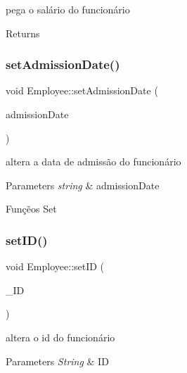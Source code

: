 pega o salário do funcionário 

\begin{DoxyReturn}{Returns}

\end{DoxyReturn}
\mbox{\label{classEmployee_ae513cdd4bf5b02cc20164fdfd18afe26}} 
\subsubsection{\texorpdfstring{set\+Admission\+Date()}{setAdmissionDate()}}
{\footnotesize\ttfamily void Employee\+::set\+Admission\+Date (\begin{DoxyParamCaption}\item[{string}]{admission\+Date }\end{DoxyParamCaption})}



altera a data de admissão do funcionário 


\begin{DoxyParams}{Parameters}
{\em string} & admission\+Date\\
\hline
\end{DoxyParams}
Funçẽos Set \mbox{\label{classEmployee_a9e0e5ac20c4179ac1926b59fb34f3933}} 
\subsubsection{\texorpdfstring{set\+I\+D()}{setID()}}
{\footnotesize\ttfamily void Employee\+::set\+ID (\begin{DoxyParamCaption}\item[{string}]{\+\_\+\+ID }\end{DoxyParamCaption})}



altera o id do funcionário 


\begin{DoxyParams}{Parameters}
{\em String} & ID \\
\hline
\end{DoxyParams}
\mbox{\label{classEmployee_a835df66ad4a23a0bd537f1a4baaf8565}} 
